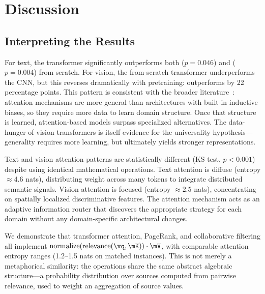 \section{Discussion}
\label{sec:discussion}

\subsection{Interpreting the Results}

For text, the transformer significantly outperforms both \bilstm ($p{=}0.046$) and \bow ($p{=}0.004$) from scratch. For vision, the from-scratch transformer underperforms the CNN, but this reverses dramatically with pretraining: \vit outperforms \resnet by 22 percentage points. This pattern is consistent with the broader literature~\citep{dosovitskiy2021image}: attention mechanisms are more general than architectures with built-in inductive biases, so they require more data to learn domain structure. Once that structure is learned, attention-based models surpass specialized alternatives. The data-hunger of vision transformers is itself evidence for the universality hypothesis---generality requires more learning, but ultimately yields stronger representations.

Text and vision attention patterns are statistically different (KS test, $p{<}0.001$) despite using identical mathematical operations. Text attention is diffuse (entropy ${\approx}4.6$ nats), distributing weight across many tokens to integrate distributed semantic signals. Vision attention is focused (entropy ${\approx}2.5$ nats), concentrating on spatially localized discriminative features. The attention mechanism acts as an adaptive information router that discovers the appropriate strategy for each domain without any domain-specific architectural changes.

We demonstrate that transformer attention, PageRank, and collaborative filtering all implement $\text{normalize}(\text{relevance}(\vq, \mK)) \cdot \mV$, with comparable attention entropy ranges (1.2--1.5 nats on matched instances). This is not merely a metaphorical similarity: the operations share the same abstract algebraic structure---a probability distribution over sources computed from pairwise relevance, used to weight an aggregation of source values.

